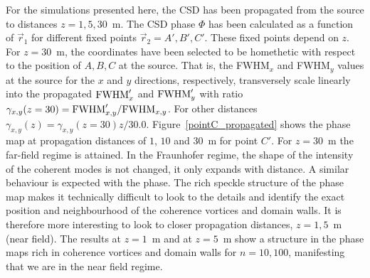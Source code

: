 \documentclass[%
 reprint,
 amsmath,amssymb,
 aps,
]{revtex4-1}
\begin{document}
For the simulations presented here, the CSD has been propagated from the source to distances $z=1,5,30$~m. The CSD phase $\Phi$ has been calculated as a function of $\vec{r}_1$ for different fixed points $\vec{r}_2=A',B',C'$. These fixed points depend on $z$. For $z=30$~m, the coordinates have been selected to be homethetic with respect to the position of $A, B, C$ at the source. That is, the FWHM$_x$ and FWHM$_y$ values at the source for the $x$ and $y$ directions, respectively, transversely scale linearly into the propagated ${\rm FWHM}'_x$ and ${\rm FWHM}'_y$ with ratio $\gamma_{x,y}(z=30)={\rm FWHM}'_{x,y}/{\rm FWHM}_{x,y}$.
For other distances $\gamma_{x,y}(z)= \gamma_{x,y}(z=30) z / 30.0$. Figure~\ref{pointC_propagated} shows the phase map at propagation distances of $1$, $10$ and $30$~m for point $C'$. For $z=30$~m the far-field regime is attained. In the Fraunhofer regime, the shape of the intensity of the coherent modes is not changed, it only expands with distance. A similar behaviour is expected with the phase. The rich speckle structure of the phase map makes it technically difficult to look to the details and identify the exact position and neighbourhood of the coherence vortices and domain walls. It is therefore more interesting to look to closer propagation distances, $z=1,5$~m (near field).  The results at $z=1$~m and at $z=5$~m show a structure in the phase maps rich in coherence vortices and domain walls for $n=10,100$, manifesting that we are in the near field regime. 
\end{document}
